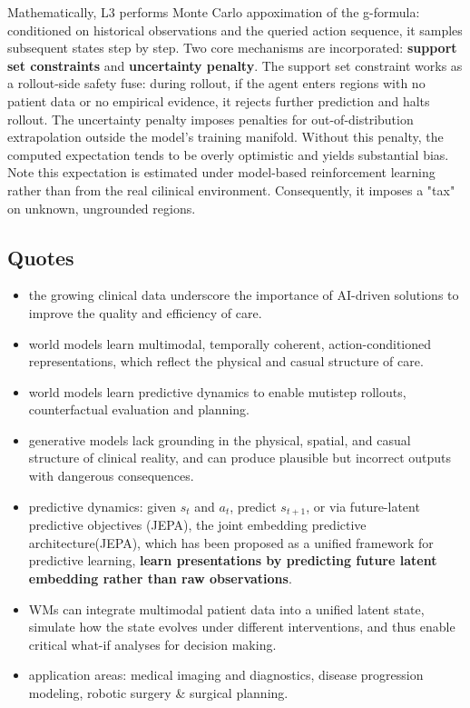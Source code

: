 \documentclass{article}
\begin{document}
\noindent Mathematically, L3 performs Monte Carlo appoximation of the g-formula: conditioned on historical observations and the queried action sequence, it samples subsequent states step by step. Two core mechanisms are incorporated: \textbf{support set constraints} and \textbf{uncertainty penalty}. The support set constraint works as a rollout-side safety fuse: during rollout, if the agent enters regions with no patient data or no empirical evidence, it rejects further prediction and halts rollout. The uncertainty penalty imposes penalties for out-of-distribution extrapolation outside the model's training manifold. Without this penalty, the computed expectation tends to be overly optimistic and yields substantial bias. Note this expectation is estimated under model-based reinforcement learning rather than from the real cilinical environment. Consequently, it imposes a "tax" on unknown, ungrounded regions.

\subsection{Quotes}

\begin{itemize}
    \item the growing clinical data underscore the importance of AI-driven solutions to improve the quality and efficiency of care.
    \item world models learn multimodal, temporally coherent, action-conditioned representations, which reflect the physical and casual structure of care.
    \item world models learn predictive dynamics to enable mutistep rollouts, counterfactual evaluation and planning.
    \item generative models lack grounding in the physical, spatial, and casual structure of clinical reality, and can produce plausible but incorrect outputs with dangerous consequences.
    \item predictive dynamics: given $s_t$ and $a_t$, predict $s_{t+1}$, or via future-latent predictive objectives (JEPA), the joint embedding predictive architecture(JEPA), which has been proposed as a unified framework for predictive learning, \textbf{learn presentations by predicting future latent embedding rather than raw observations}.
    \item WMs can integrate multimodal patient data into a unified latent state, simulate how the state evolves under different interventions, and thus enable critical what-if analyses for decision making.
    \item application areas: medical imaging and diagnostics, disease progression modeling, robotic surgery \& surgical planning.
\end{itemize}



\printbibliography
\end{document}
